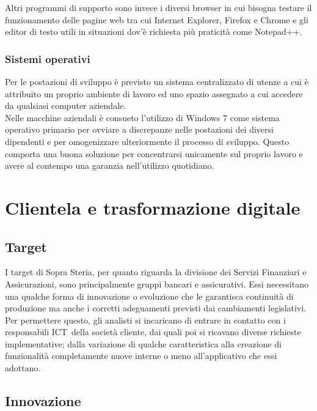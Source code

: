 	Altri programmi di supporto sono invece i diversi browser in cui bisogna testare il funzionamento delle pagine web tra cui Internet Explorer, Firefox e Chrome e gli editor di testo utili in situazioni dov'è richiesta più praticità come Notepad++.
	
	\subsubsection{Sistemi operativi}
	Per le postazioni di sviluppo è previsto un sistema centralizzato di utenze a cui è attribuito un proprio ambiente di lavoro ed uno spazio assegnato a cui accedere da qualsiasi computer aziendale.\\
	
	Nelle macchine aziendali è consueto l'utilizzo di Windows 7 come sistema operativo primario per ovviare a discrepanze nelle postazioni dei diversi dipendenti e per omogenizzare ulteriormente il processo di sviluppo. Questo comporta una buona soluzione per concentrarsi unicamente sul proprio lavoro e avere al contempo una garanzia nell'utilizzo quotidiano.
	
\section{Clientela e trasformazione digitale}

	\subsection{Target}
	
	I target di Sopra Steria, per quanto riguarda la divisione dei Servizi Finanziari e Assicurazioni, sono principalmente gruppi bancari e assicurativi. Essi necessitano una qualche forma di innovazione o evoluzione che le garantisca continuità di produzione ma anche i corretti adeguamenti previsti dai cambiamenti legislativi.\\
	
	 Per permettere questo, gli analisti si incaricano di entrare in contatto con i responsabili ICT\glossario\ della società cliente, dai quali poi si ricavano diverse richieste implementative; dalla variazione di	qualche caratteristica alla creazione di funzionalità completamente nuove interne o meno all'applicativo che essi adottano. 
	
	\subsection{Innovazione}
	
